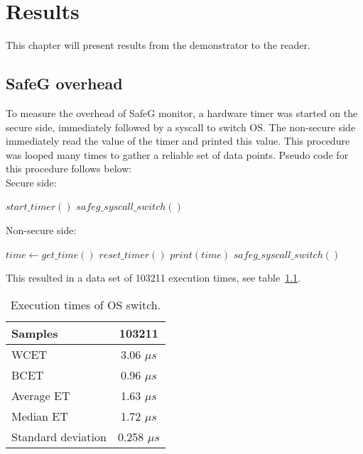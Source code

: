 \chapter{Results}
\label{sec:results}

This chapter will present results from the demonstrator to the reader.



\section{SafeG overhead}
To measure the overhead of SafeG monitor, a hardware timer was started on the secure side, immediately followed by a syscall to switch OS. The non-secure side immediately read the value of the timer and printed this value. This procedure was looped many times to gather a reliable set of data points. Pseudo code for this procedure follows below:\\

Secure side:
\begin{algorithmic}
\Loop
	\State $start\_timer()$
	\State $safeg\_syscall\_switch()$
\EndLoop
\end{algorithmic}

Non-secure side:
\begin{algorithmic}
\Loop
	\State $time\gets get\_time()$
	\State $reset\_timer()$
	\State $print(time)$
	\State $safeg\_syscall\_switch()$
\EndLoop
\end{algorithmic}


This resulted in a data set of 103211 execution times, see table~\ref{table:switch_et}.

\begin{table}[H]
\centering
\begin{tabular}{|l|c|}
\hline
Samples & 103211\\ \hline
WCET & 3.06 $\mu s$\\ \hline
BCET & 0.96 $\mu s$\\ \hline
Average ET & 1.63 $\mu s$\\ \hline
Median ET & 1.72 $\mu s$\\ \hline
Standard deviation & 0.258 $\mu s$\\ \hline
\end{tabular}
\caption{Execution times of OS switch.}
\label{table:switch_et}
\end{table}


